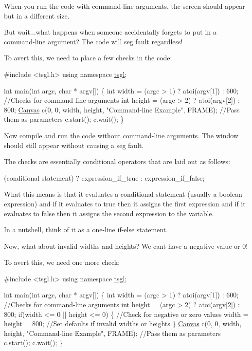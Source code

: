 When you run the code with command-\/line arguments, the screen should appear but in a different size.

But wait...what happens when someone accidentally forgets to put in a command-\/line argument? The code will seg fault regardless!

To avert this, we need to place a few checks in the code\+:


\begin{DoxyCode}
\textcolor{preprocessor}{#include <tsgl.h>}
\textcolor{keyword}{using namespace }\hyperlink{namespacetsgl}{tsgl};

\textcolor{keywordtype}{int} main(\textcolor{keywordtype}{int} argc, \textcolor{keywordtype}{char} * argv[]) \{
  \textcolor{keywordtype}{int} width = (argc > 1) ? atoi(argv[1]) : 600; \textcolor{comment}{//Checks for command-line arguments}
  \textcolor{keywordtype}{int} height = (argc > 2) ? atoi(argv[2]) : 800;
  \hyperlink{classtsgl_1_1_canvas}{Canvas} c(0, 0, width, height, \textcolor{stringliteral}{"Command-line Example"}, FRAME);  \textcolor{comment}{//Pass them as parameters}
  c.start();
  c.wait();
\}
\end{DoxyCode}


Now compile and run the code without command-\/line arguments. The window should still appear without causing a seg fault.

The checks are essentially conditional operators that are laid out as follows\+:

(conditional statement) ? expression\+\_\+if\+\_\+true \+: expression\+\_\+if\+\_\+false;

What this means is that it evaluates a conditional statement (usually a boolean expression) and if it evaluates to true then it assigns the first expression and if it evaluates to false then it assigns the second expression to the variable.

In a nutshell, think of it as a one-\/line if-\/else statement.

Now, what about invalid widths and heights? We can\textquotesingle{}t have a negative value or 0!

To avert this, we need one more check\+:


\begin{DoxyCode}
\textcolor{preprocessor}{#include <tsgl.h>}
\textcolor{keyword}{using namespace }\hyperlink{namespacetsgl}{tsgl};

\textcolor{keywordtype}{int} main(\textcolor{keywordtype}{int} argc, \textcolor{keywordtype}{char} * argv[]) \{
  \textcolor{keywordtype}{int} width = (argc > 1) ? atoi(argv[1]) : 600;  \textcolor{comment}{//Checks for command-line arguments}
  \textcolor{keywordtype}{int} height = (argc > 2) ? atoi(argv[2]) : 800;
  \textcolor{keywordflow}{if}(width <= 0 || height <= 0) \{  \textcolor{comment}{//Check for negative or zero values}
    width = height = 800;  \textcolor{comment}{//Set defaults if invalid widths or heights}
  \}
  \hyperlink{classtsgl_1_1_canvas}{Canvas} c(0, 0, width, height, \textcolor{stringliteral}{"Command-line Example"}, FRAME);  \textcolor{comment}{//Pass them as parameters}
  c.start();
  c.wait();
\}
\end{DoxyCode}


